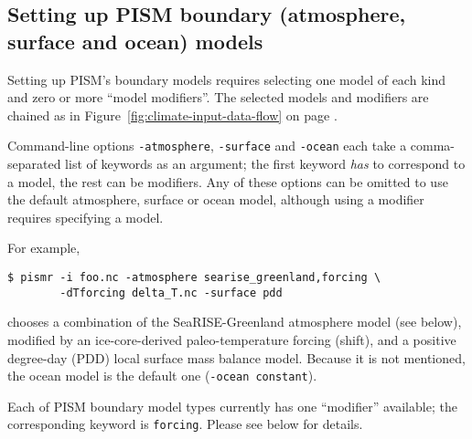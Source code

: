 \subsection{Setting up PISM boundary (atmosphere, surface and ocean) models}
\label{sec:boundary-models}

Setting up PISM's boundary models requires selecting one model of each kind and zero or more ``model modifiers''.  The selected models and modifiers are chained as in Figure~\ref{fig:climate-input-data-flow} on page \pageref{fig:climate-input-data-flow}.

Command-line options \texttt{-atmosphere}, \texttt{-surface} and \texttt{-ocean} each take a comma-separated list of keywords as an argument; the first keyword \emph{has} to correspond to a model, the rest can be modifiers. Any of these options can be omitted to use the default atmosphere, surface or ocean model, although using a modifier requires specifying a model.

For example,
\begin{verbatim}
$ pismr -i foo.nc -atmosphere searise_greenland,forcing \
        -dTforcing delta_T.nc -surface pdd
\end{verbatim}%
chooses a combination of the SeaRISE-Greenland atmosphere model (see below), modified by an ice-core-derived paleo-temperature forcing (shift), and a positive degree-day (PDD) local surface mass balance model.  Because it is not mentioned, the ocean model is the default one (\verb|-ocean constant|).

Each of PISM boundary model types currently has one ``modifier'' available; the corresponding keyword is \texttt{forcing}. Please see below for details.

